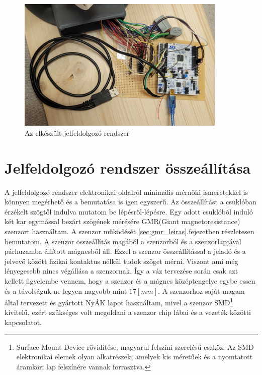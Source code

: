 \begin{figure}[!ht]
\centering
\includegraphics[width=100mm, keepaspectratio]{figures/Csuklo_szog_teszt/mikrovez_2}
\caption{Az elkészült jelfeldolgozó rendszer}
\label{fig:mikrovez_2}
\end{figure}

\section{Jelfeldolgozó rendszer összeállítása}

A jelfeldolgozó rendszer elektronikai oldalról minimális mérnöki ismeretekkel is könnyen megérhető és a bemutatása is igen egyszerű. Az összeállítást a csuklóban érzékelt szögtől indulva mutatom be lépésről-lépésre. Egy adott csuklóból induló két kar egymással bezárt szögének mérésére GMR(Giant magnetoresistance) szenzort használtam. A szenzor működését \ref{sec:gmr_leiras}.fejezetben részletesen bemutatom. A szenzor összeállítás magából a szenzorból és a szenzorlapjával párhuzamba állított mágnesből áll. Ezzel a szenzor összeállítással a jeladó és a jelvevő között fizikai kontaktus nélkül tudok szöget mérni. Viszont ami még lényegesebb nincs végállása a szenzornak. Így a váz tervezése során csak azt kellett figyelembe vennem, hogy a szenzor és a mágnes középtengelye egybe essen és a távolságuk ne legyen nagyobb mint $17[mm]$. A szenzorhoz saját magam által tervezett és gyártott NyÁK lapot használtam, mivel a szenzor SMD\footnote{ Surface Mount Device rövidítése, magyarul felszíni szerelésű eszköz. Az SMD elektronikai elemek olyan alkatrészek, amelyek kis méretűek és a nyomtatott áramköri lap felszínére vannak forrasztva.} kivitelű, ezért szükséges volt megoldani a szenzor chip lábai és a vezeték közötti kapcsolatot.\cite{vezetekellen}

